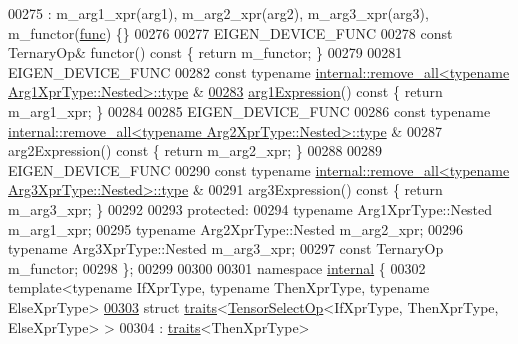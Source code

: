 \begin{DoxyCode}
00275         : m\_arg1\_xpr(arg1), m\_arg2\_xpr(arg2), m\_arg3\_xpr(arg3), m\_functor(\hyperlink{structfunc}{func}) \{\}
00276 
00277     EIGEN\_DEVICE\_FUNC
00278     \textcolor{keyword}{const} TernaryOp& functor()\textcolor{keyword}{ const }\{ \textcolor{keywordflow}{return} m\_functor; \}
00279 
00281     EIGEN\_DEVICE\_FUNC
00282     \textcolor{keyword}{const} \textcolor{keyword}{typename} \hyperlink{group___sparse_core___module}{internal::remove\_all<typename Arg1XprType::Nested>::type}
      &
\hyperlink{class_eigen_1_1_tensor_cwise_ternary_op_a6e797469eff84e6b24dab5bf5f2c1da8}{00283}     \hyperlink{class_eigen_1_1_tensor_cwise_ternary_op_a6e797469eff84e6b24dab5bf5f2c1da8}{arg1Expression}()\textcolor{keyword}{ const }\{ \textcolor{keywordflow}{return} m\_arg1\_xpr; \}
00284 
00285     EIGEN\_DEVICE\_FUNC
00286     \textcolor{keyword}{const} \textcolor{keyword}{typename} \hyperlink{group___sparse_core___module}{internal::remove\_all<typename Arg2XprType::Nested>::type}
      &
00287     arg2Expression()\textcolor{keyword}{ const }\{ \textcolor{keywordflow}{return} m\_arg2\_xpr; \}
00288 
00289     EIGEN\_DEVICE\_FUNC
00290     \textcolor{keyword}{const} \textcolor{keyword}{typename} \hyperlink{group___sparse_core___module}{internal::remove\_all<typename Arg3XprType::Nested>::type}
      &
00291     arg3Expression()\textcolor{keyword}{ const }\{ \textcolor{keywordflow}{return} m\_arg3\_xpr; \}
00292 
00293   \textcolor{keyword}{protected}:
00294     \textcolor{keyword}{typename} Arg1XprType::Nested m\_arg1\_xpr;
00295     \textcolor{keyword}{typename} Arg2XprType::Nested m\_arg2\_xpr;
00296     \textcolor{keyword}{typename} Arg3XprType::Nested m\_arg3\_xpr;
00297     \textcolor{keyword}{const} TernaryOp m\_functor;
00298 \};
00299 
00300 
00301 \textcolor{keyword}{namespace }\hyperlink{namespaceinternal}{internal} \{
00302 \textcolor{keyword}{template}<\textcolor{keyword}{typename} IfXprType, \textcolor{keyword}{typename} ThenXprType, \textcolor{keyword}{typename} ElseXprType>
\hyperlink{struct_eigen_1_1internal_1_1traits_3_01_tensor_select_op_3_01_if_xpr_type_00_01_then_xpr_type_00_01_else_xpr_type_01_4_01_4}{00303} \textcolor{keyword}{struct }\hyperlink{struct_eigen_1_1internal_1_1traits}{traits}<\hyperlink{class_eigen_1_1_tensor_select_op}{TensorSelectOp}<IfXprType, ThenXprType, ElseXprType> >
00304     : \hyperlink{struct_eigen_1_1internal_1_1traits}{traits}<ThenXprType>

\end{DoxyCode}
